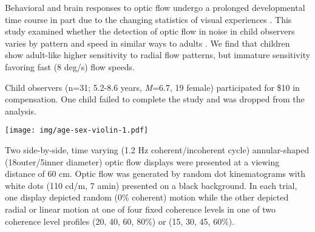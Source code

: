 \documentclass[landscape,final,paperwidth=60in,paperheight=39in,fontscale=0.285]{baposter}
\begin{document}
\begin{poster}
%
    {
      Behavioral and brain responses to optic flow undergo a prolonged developmental time course \cite{gilmore_childrens_2016} in part due to the changing statistics of visual experiences \cite{gilmore_what_2015,raudies_visual_2014}. This study examined whether the detection of optic flow in noise in child observers varies by pattern and speed in similar ways to adults \cite{adamiak_adult_2015}. We find that children show adult-like higher sensitivity to radial flow patterns, but immature sensitivity favoring fast (8 deg/s) flow speeds.
    }
    {
\par Child observers (n=31; 5.2-8.6 years, \emph{M}=6.7, 19 female) participated for \$10 in compensation. One child failed to complete the study and was dropped from the analysis.
\begin{center}
\texttt{[image: img/age-sex-violin-1.pdf]}
\end{center}
\par Two side-by-side, time varying (1.2 Hz coherent/incoherent cycle) annular-shaped (18\degree outer/5\degree inner diameter) optic flow displays were presented at a viewing distance of 60 cm. Optic flow was generated by random dot kinematograms with white dots (110 cd/m, 7 amin) presented on a black background. In each trial, one display depicted random (0\% coherent) motion while the other depicted radial or linear motion at one of four fixed coherence levels in one of two coherence level profiles (20, 40, 60, 80\%) or (15, 30, 45, 60\%).
}
\end{poster}
\end{document}
